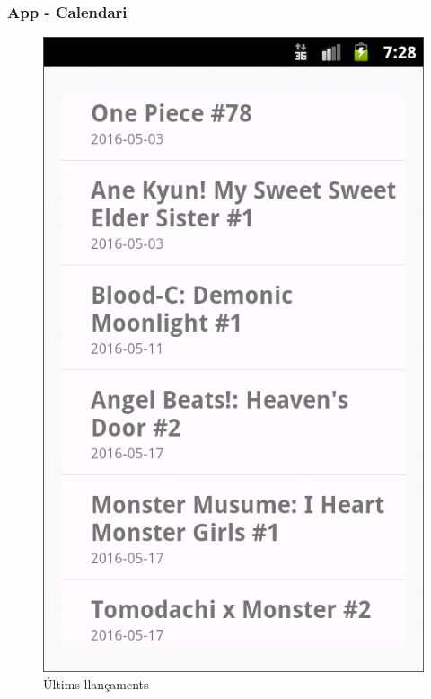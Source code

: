 \documentclass{beamer}
\begin{document}
	\begin{frame}
	\frametitle{App - Calendari}
		\begin{figure}
			\centering
			\includegraphics[scale=0.23]{new_releases.png}
			\caption{Últims llançaments}
		\end{figure}
	\end{frame}
\end{document}

